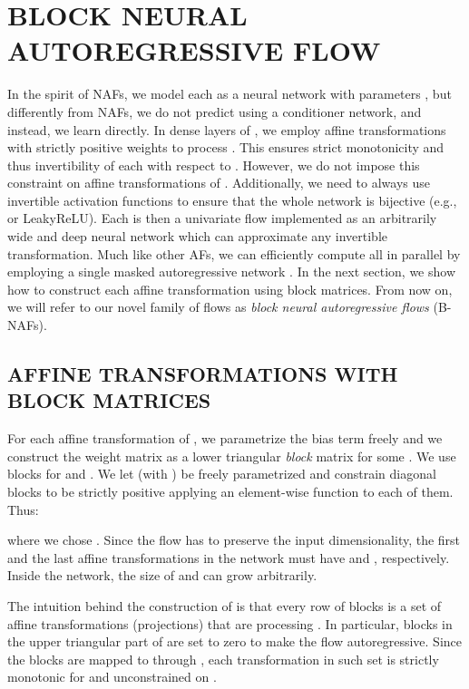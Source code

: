 \documentclass[letterpaper]{article}
\begin{document}
\section{BLOCK NEURAL AUTOREGRESSIVE FLOW} \label{sec:bnaf}
In the spirit of NAFs, we model each 
as a neural network with parameters , but differently from NAFs, we do not predict  using a conditioner network, and instead, we learn  directly. In dense layers of , we employ affine transformations with strictly positive weights to process . This ensures strict monotonicity and thus invertibility of each  with respect to . However, we do not impose this constraint on affine transformations of . Additionally, we need to always use invertible activation functions to ensure that the whole network is bijective (e.g.,  or LeakyReLU). Each  is then a univariate flow implemented as an arbitrarily wide and deep neural network which can approximate any invertible transformation. Much like other AFs, we can efficiently compute all  in parallel by employing a single masked autoregressive network \citep{germain2015made}. In the next section, we show how to construct each affine transformation using block matrices. From now on, we will refer to our novel family of flows as \emph{block neural autoregressive flows} (B-NAFs).

\subsection{AFFINE TRANSFORMATIONS WITH BLOCK MATRICES}
For each affine transformation of , we parametrize the bias term freely and we construct the weight matrix  as a lower triangular \emph{block} matrix for some . We use  blocks  for  and . We let  (with ) be freely parametrized and constrain diagonal blocks to be strictly positive applying an element-wise function  to each of them. Thus:

where we chose . Since the flow has to preserve the input dimensionality, the first and the last affine transformations in the network must have  and , respectively. Inside the network, the size of  and  can grow arbitrarily. 

The intuition behind the construction of  is that every row of blocks  is a set of affine transformations (projections) that are processing . In particular, blocks in the upper triangular part of  are set to zero to make the flow autoregressive. Since the blocks  are mapped to  through , each transformation in such set is strictly monotonic for  and unconstrained on .
\end{document}
